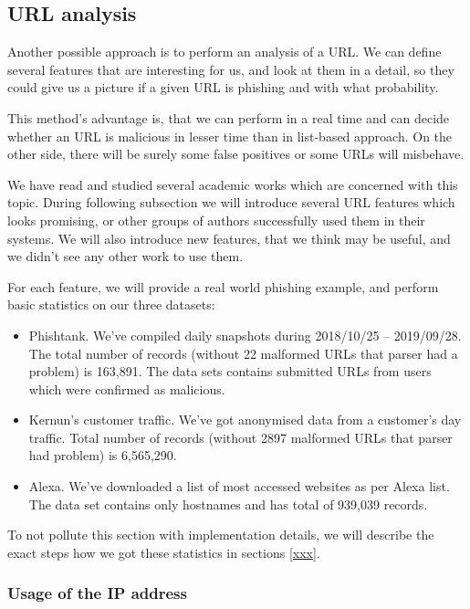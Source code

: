 \documentclass[
  digital, %
  oneside, %
  table,   %
  nolof,     %
  nolot,     %
]{fithesis3}
\newcounter{feature}
\begin{document}
\subsection{URL analysis}
\label{section:url-analysis}


Another possible approach is to perform an analysis of a URL. We can define several features that are interesting for us, and look at them in a detail, so they could give us a picture if a given URL is phishing and with what probability.

This method's advantage is, that we can perform in a real time and can decide whether an URL is malicious in lesser time than in list-based approach. On the other side, there will be surely some false positives or some URLs will misbehave. 

We have read and studied several academic works which are concerned with this topic. During following subsection we will introduce several URL features which looks promising, or other groups of authors successfully used them in their systems. We will also introduce new features, that we think may be useful, and we didn't see any other work to use them.

For each feature, we will provide a real world phishing example, and perform basic statistics on our three datasets:
\begin{itemize}
    \item Phishtank. We've compiled daily snapshots during 2018/10/25 -- 2019/09/28. The total number of records (without 22 malformed URLs that parser had a problem) is 163,891. The data sets contains submitted URLs from users which were confirmed as malicious. 
    \item Kernun's customer traffic. We've got anonymised data from a customer's day traffic. Total number of records (without 2897 malformed URLs that parser had problem) is 6,565,290. 
    \item Alexa. We've downloaded a list of most accessed websites as per Alexa list. The data set contains only hostnames and has total of 939,039 records.  
\end{itemize}
To not pollute this section with implementation details, we will describe the exact steps how we got these statistics in sections \ref{xxx}.

\subsubsection{Usage of the IP address \cite{url-features-work} \cite{new-method-for-detection}
\cite{fresh-phish}} 
\end{document}
